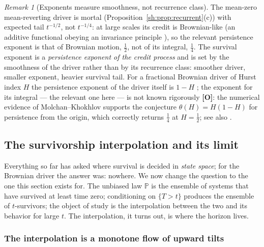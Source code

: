 \documentclass[11pt]{article}
\numberwithin{equation}{section}
\theoremstyle{plain}
\theoremstyle{definition}
\theoremstyle{remark}
\newtheorem{remark}[theorem]{Remark}
\newcommand{\PP}{\mathbb{P}}
\begin{document}
\begin{remark}[Exponents measure smoothness, not recurrence class]
\label{sh:rem:smoothness}
The mean-zero mean-reverting driver is mortal
(Proposition~\ref{sh:prop:recurrent}(c)) with expected tail $t^{-1/2}$, not
$t^{-1/4}$: at large scales its credit is Brownian-like (an additive
functional obeying an invariance principle \cite{Bha82}), so the relevant
persistence exponent is that of Brownian motion, $\tfrac12$, not of its
integral, $\tfrac14$. The survival exponent is a \emph{persistence exponent
of the credit process} and is set by the smoothness of the driver rather
than by its recurrence class: smoother driver, smaller exponent, heavier
survival tail. For a fractional Brownian driver of Hurst index $H$ the
persistence exponent of the driver itself is $1-H$ \cite{Mol99}; the
exponent for its integral --- the relevant one here --- is not known
rigorously \textbf{[O]}: the numerical evidence of Molchan--Khokhlov
\cite{MK04} supports the conjecture $\theta(H)=H(1-H)$ for persistence
from the origin, which correctly returns $\tfrac14$ at $H=\tfrac12$;
see also \cite{AS15}.
\end{remark}

\subsection{The survivorship interpolation and its limit}
\label{sh:sub:interp}

Everything so far has asked where survival is decided in \emph{state
space}; for the Brownian driver the answer was: nowhere. We now change
the question to the one this section exists for. The unbiased law $\PP$
is the ensemble of systems that have survived at least time zero;
conditioning on $\{T>t\}$ produces the ensemble of $t$-survivors; the
object of study is the interpolation between the two and its behavior for
large $t$. The interpolation, it turns out, is where the horizon lives.

\subsubsection{The interpolation is a monotone flow of upward tilts}
\label{sh:subsub:flow}
\end{document}
